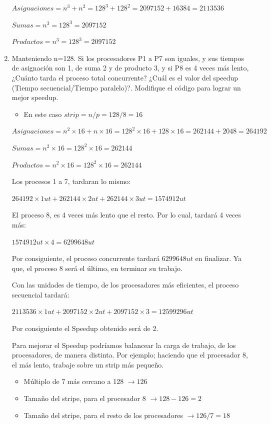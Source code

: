 \documentclass[a4paper, 10pt]{article}
\newenvironment{QandA}{
    \begin{enumerate}\bfseries}
    {\end{enumerate}
}
\newenvironment{answered}{\par\normalfont}{}
\begin{document}
\begin{QandA}
\begin{enumerate}
\begin{answered}
$Asignaciones = n^3 + n^2 = 128^3 + 128^2 = 2097152 + 16384 = 2113536$

$Sumas = n^3 = 128^3 = 2097152$

$Productos = n^3 = 128^3 = 2097152$ 
\end{answered}
\item Manteniendo n=128. Si los procesadores P1 a P7 son iguales, y sus tiempos de asignación son 1, de suma 2 y de producto 3, y si
P8 es 4 veces más lento, ¿Cuánto tarda el proceso total concurrente? ¿Cuál es el valor del speedup (Tiempo
secuencial/Tiempo paralelo)?. Modifique el código para lograr un mejor speedup.
\begin{answered}
\begin{itemize}
    \item En este caso $strip = n/p = 128/8 = 16$
\end{itemize}

$Asignaciones = n^2 \times 16 + n \times 16 = 128^2 \times 16 + 128 \times 16 = 262144 + 2048 = 264192$

$Sumas = n^2 \times 16 = 128^2 \times 16 = 262144$

$Productos = n^2 \times 16 = 128^2 \times 16 = 262144$

Los procesos 1 a 7, tardaran lo mismo:

$264192 \times 1 ut + 262144 \times 2 ut + 262144 \times 3 ut = 1574912 ut$

El proceso 8, es 4 veces más lento que el resto. Por lo cual, tardará 4 veces más:

$1574912 ut \times 4 = 6299648 ut$

Por consiguiente, el proceso concurrente tardará $6299648 ut$ en finalizar. Ya que, el proceso 8 será el último, en terminar su trabajo.

Con las unidades de tiempo, de los procesadores más eficientes, el proceso secuencial tardará:

$2113536 \times 1 ut + 2097152 \times 2 ut + 2097152 \times 3 = 12599296 ut$

Por consiguiente el Speedup obtenido será de 2.

Para mejorar el Speedup podríamos balancear la carga de trabajo, de los procesadores, de manera distinta. Por ejemplo; haciendo que el procesador 8, el más lento, trabaje sobre un strip más pequeño.

\begin{itemize}
    \item Múltiplo de 7 más cercano a 128 $\rightarrow 126$
    \item Tamaño del stripe, para el procesador 8 $\rightarrow 128 - 126 = 2$
    \item Tamaño del stripe, para el resto de los procesadores $\rightarrow 126/7 = 18$
\end{itemize}


\end{answered}
\end{enumerate}
\end{QandA}
\end{document}

